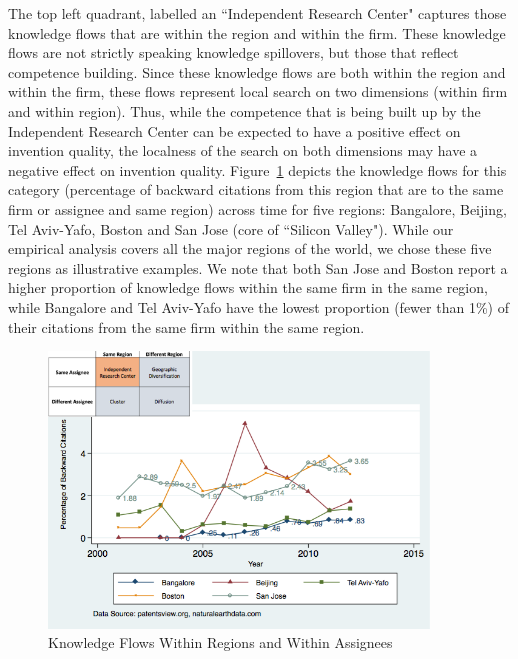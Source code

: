 \documentclass[12pt,letterpaper]{article}
\begin{document}
The top left quadrant, labelled an ``Independent Research Center" captures those knowledge flows that are within the region and within the firm. These knowledge flows are not strictly speaking knowledge spillovers, but those that reflect competence building. Since these knowledge flows  are both within the region and within the firm, these flows represent local search on two dimensions (within firm and within region).  Thus, while the competence that is being built up by the Independent Research Center can be expected to have a positive effect on invention quality, the localness of the search on both dimensions may have a negative effect on invention quality. Figure~\ref{fig:SMSSameRegionSameAssigneeFlows} depicts the knowledge flows for this category (percentage of backward citations from this region that are to the same firm or assignee and same region) across time for five regions: Bangalore, Beijing, Tel Aviv-Yafo, Boston and San Jose (core of ``Silicon Valley"). While our empirical analysis covers all the major regions of the world, we chose these five regions as illustrative examples. We note that both San Jose and Boston report a higher proportion of knowledge flows within the same firm in the same region, while Bangalore and Tel Aviv-Yafo have the lowest proportion (fewer than 1\%) of their citations from the same firm within the same region. \par

\begin{figure}[h]
\begin{centering}
  \caption{\newline Knowledge Flows Within Regions and Within Assignees}
  \label{fig:SMSSameRegionSameAssigneeFlows}
  \includegraphics[width=0.90\textwidth]{SMSSameRegionSameAssigneeFlows}
\end{centering}
\end{figure}
\end{document}
